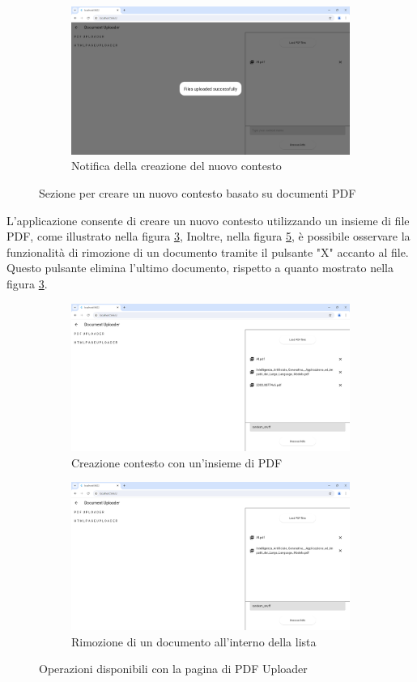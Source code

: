 \begin{figure}[H]
\begin{subfigure}{.5\textwidth}
		\centering
		\includegraphics[width=0.45\linewidth]{Immagini/pdfs_successfully_upload.png}
		\caption{Notifica della creazione del nuovo contesto \newline}
		\label{fig:pdf_success}
	\end{subfigure}%
	\caption{Sezione per creare un nuovo contesto basato su documenti PDF}
\end{figure}

L'applicazione consente di creare un nuovo contesto utilizzando un insieme di file PDF, come illustrato nella figura \ref{fig:pdfs_context}, Inoltre, nella figura \ref{fig:pdf_removed}, è possibile osservare la funzionalità di rimozione di un documento tramite il pulsante "X" accanto al file. Questo pulsante elimina l'ultimo documento, rispetto a quanto mostrato nella figura \ref{fig:pdfs_context}.
\begin{figure}[H]
	\centering
        \begin{subfigure}{.5\textwidth}
		\centering
		\includegraphics[width=0.45\linewidth]{Immagini/random_stuff.png}
		\caption{Creazione contesto con un'insieme di PDF\newline}
		\label{fig:pdfs_context}
	\end{subfigure}%
        \begin{subfigure}{.5\textwidth}
		\centering
		\includegraphics[width=0.45\linewidth]{Immagini/remove_one.png}
		\caption{Rimozione di un documento all'interno della lista\newline}
		\label{fig:pdf_removed}
	\end{subfigure}%
	\caption{Operazioni disponibili con la pagina di PDF Uploader}
\end{figure}

